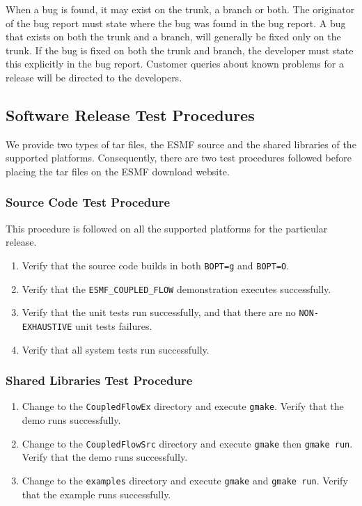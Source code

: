 When a bug is found, it may exist on the trunk, a branch or both. The originator of the bug report
must state where the bug was found in the bug report.  A bug that exists on both the trunk and a 
branch, will generally be fixed only on the trunk. If the bug is fixed on both the trunk and branch, the 
developer must state this explicitly in the bug report.  Customer queries about known problems for a 
release will be directed to the developers.



\subsection{Software Release Test Procedures}

We provide two types of tar files, the ESMF source and the shared libraries of 
the supported platforms. Consequently, there are two test procedures followed before placing the 
tar files on the ESMF download website. 

\subsubsection{Source Code Test Procedure}

This procedure is followed on all the supported platforms for the particular release.

\begin{enumerate}
\item Verify that the source code builds in both {\tt BOPT=g} and {\tt BOPT=O}.
\item Verify that  the {\tt ESMF\_COUPLED\_FLOW} demonstration executes successfully.
\item Verify that the unit tests run successfully, and that there are no {\tt NON-EXHAUSTIVE} unit tests  failures.
\item Verify that all system tests run successfully. 
\end{enumerate}


\subsubsection{Shared Libraries Test Procedure}

\begin{enumerate}
\item Change to the {\tt CoupledFlowEx} directory and execute {\tt gmake}. Verify that the demo runs successfully.
\item Change to the {\tt CoupledFlowSrc} directory and execute {\tt gmake} then {\tt gmake run}. Verify that the demo runs successfully.
\item Change to the {\tt examples} directory and execute {\tt gmake} and {\tt gmake run}. Verify that the example runs successfully.
\end{enumerate}


